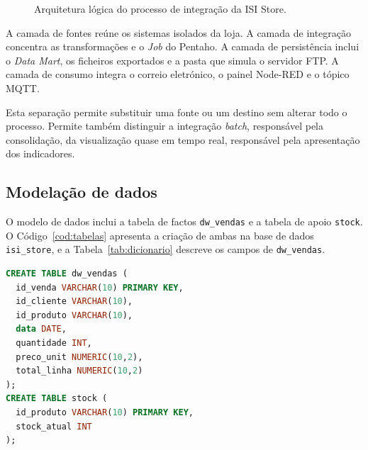 \documentclass[11pt,a4paper]{article}
\begin{document}
\begin{figure}[H]
\centering
{}
\caption{Arquitetura lógica do processo de integração da ISI Store.}
\label{fig:arquitetura}
\end{figure}

A camada de fontes reúne os sistemas isolados da loja. A camada de integração concentra as transformações e o \textit{Job} do Pentaho. A camada de persistência inclui o \textit{Data Mart}, os ficheiros exportados e a pasta que simula o servidor FTP. A camada de consumo integra o correio eletrónico, o painel Node-RED e o tópico MQTT.

Esta separação permite substituir uma fonte ou um destino sem alterar todo o processo. Permite também distinguir a integração \textit{batch}, responsável pela consolidação, da visualização quase em tempo real, responsável pela apresentação dos indicadores.

\subsection{Modelação de dados}
O modelo de dados inclui a tabela de factos \texttt{dw\_vendas} e a tabela de apoio \texttt{stock}. O Código~\ref{cod:tabelas} apresenta a criação de ambas na base de dados \texttt{isi\_store}, e a Tabela~\ref{tab:dicionario} descreve os campos de \texttt{dw\_vendas}.

\begin{lstlisting}[language=SQL, caption={Criação das tabelas dw\_vendas e stock na base de dados isi\_store.}, label={cod:tabelas}]
CREATE TABLE dw_vendas (
  id_venda VARCHAR(10) PRIMARY KEY,
  id_cliente VARCHAR(10),
  id_produto VARCHAR(10),
  data DATE,
  quantidade INT,
  preco_unit NUMERIC(10,2),
  total_linha NUMERIC(10,2)
);
CREATE TABLE stock (
  id_produto VARCHAR(10) PRIMARY KEY,
  stock_atual INT
);
\end{lstlisting}
\end{document}

